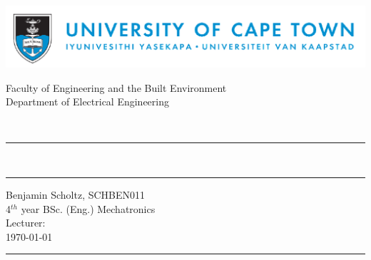 
\begin{titlepage} 
\includegraphics[width = 17cm]{images/uctbanner.png} \\

\begin{center}
\begin{LARGE}
Faculty of Engineering and the Built Environment \\
Department of Electrical Engineering \\
\end{LARGE}
\end{center}

\begin{center}  
\begin{Huge}
\textbf{\coursecode}\\
\bigskip
\bigskip
\hrule
\assignment \\
\end{Huge}

\vspace*{\fill}

\hrule
\begin{center}
Benjamin Scholtz, SCHBEN011 \\
4$^{th}$ year BSc. (Eng.) Mechatronics \\
Lecturer: \lecturer \\
\today
\end{center}
\bigskip
\hrule

\end{center}
\end{titlepage}